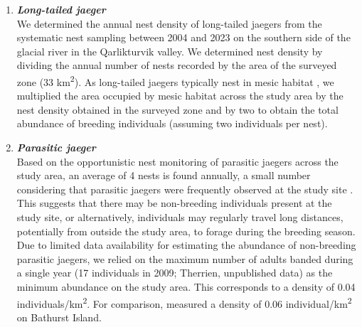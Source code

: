 \documentclass[a4paper,twoside,12pt]{article}
\begin{document}
\begin{enumerate}[label=\alph*.]
                \item[] \textit{\textbf{Long-tailed jaeger}}\\
                We determined the annual nest density of long-tailed jaegers from the systematic nest sampling between 2004 and 2023 on the southern side of the glacial river in the Qarlikturvik valley. We determined nest density by dividing the annual number of nests recorded by the area of the surveyed zone (33 km\textsuperscript{2}). As long-tailed jaegers typically nest in mesic habitat \citep{andersson1971}, we multiplied the area occupied by mesic habitat across the study area by the nest density obtained in the surveyed zone and by two to obtain the total abundance of breeding individuals (assuming two individuals per nest).
                
                \item[] \textit{\textbf{Parasitic jaeger}}\\
                Based on the opportunistic nest monitoring of parasitic jaegers across the study area, an average of 4 nests is found annually, a small number considering that parasitic jaegers were frequently observed at the study site \citep{gauthier2024a}. This suggests that there may be non-breeding individuals present at the study site, or alternatively, individuals may regularly travel long distances, potentially from outside the study area, to forage during the breeding season. Due to limited data availability for estimating the abundance of non-breeding parasitic jaegers, we relied on the maximum number of adults banded during a single year (17 individuals in 2009; Therrien, unpublished data) as the minimum abundance on the study area. This corresponds to a density of 0.04 individuals/km\textsuperscript{2}. For comparison, \citet{taylor1974} measured a density of 0.06 individual/km\textsuperscript{2} on Bathurst Island.
                

\end{enumerate}
\end{document}
